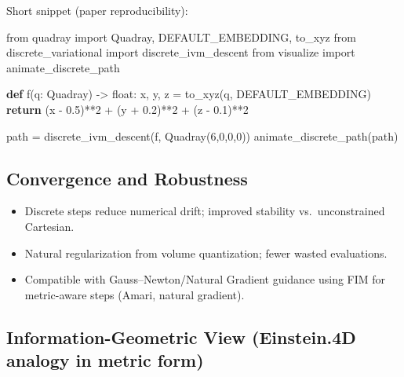 \documentclass[
]{article}
\newenvironment{Shaded}{}{}
\newcommand{\BuiltInTok}[1]{#1}
\newcommand{\ControlFlowTok}[1]{\textcolor[rgb]{0.00,0.44,0.13}{\textbf{#1}}}
\newcommand{\DecValTok}[1]{\textcolor[rgb]{0.25,0.63,0.44}{#1}}
\newcommand{\FloatTok}[1]{\textcolor[rgb]{0.25,0.63,0.44}{#1}}
\newcommand{\ImportTok}[1]{#1}
\newcommand{\KeywordTok}[1]{\textcolor[rgb]{0.00,0.44,0.13}{\textbf{#1}}}
\newcommand{\NormalTok}[1]{#1}
\newcommand{\OperatorTok}[1]{\textcolor[rgb]{0.40,0.40,0.40}{#1}}
\providecommand{\tightlist}{%
  \setlength{\itemsep}{0pt}\setlength{\parskip}{0pt}}
\begin{document}
Short snippet (paper reproducibility):

\begin{Shaded}
\begin{Highlighting}[]
\ImportTok{from}\NormalTok{ quadray }\ImportTok{import}\NormalTok{ Quadray, DEFAULT\_EMBEDDING, to\_xyz}
\ImportTok{from}\NormalTok{ discrete\_variational }\ImportTok{import}\NormalTok{ discrete\_ivm\_descent}
\ImportTok{from}\NormalTok{ visualize }\ImportTok{import}\NormalTok{ animate\_discrete\_path}

\KeywordTok{def}\NormalTok{ f(q: Quadray) }\OperatorTok{{-}\textgreater{}} \BuiltInTok{float}\NormalTok{:}
\NormalTok{    x, y, z }\OperatorTok{=}\NormalTok{ to\_xyz(q, DEFAULT\_EMBEDDING)}
    \ControlFlowTok{return}\NormalTok{ (x }\OperatorTok{{-}} \FloatTok{0.5}\NormalTok{)}\OperatorTok{**}\DecValTok{2} \OperatorTok{+}\NormalTok{ (y }\OperatorTok{+} \FloatTok{0.2}\NormalTok{)}\OperatorTok{**}\DecValTok{2} \OperatorTok{+}\NormalTok{ (z }\OperatorTok{{-}} \FloatTok{0.1}\NormalTok{)}\OperatorTok{**}\DecValTok{2}

\NormalTok{path }\OperatorTok{=}\NormalTok{ discrete\_ivm\_descent(f, Quadray(}\DecValTok{6}\NormalTok{,}\DecValTok{0}\NormalTok{,}\DecValTok{0}\NormalTok{,}\DecValTok{0}\NormalTok{))}
\NormalTok{animate\_discrete\_path(path)}
\end{Highlighting}
\end{Shaded}

\hypertarget{convergence-and-robustness}{%
\subsection{Convergence and
Robustness}\label{convergence-and-robustness}}

\begin{itemize}
\tightlist
\item
  Discrete steps reduce numerical drift; improved stability
  vs.~unconstrained Cartesian.
\item
  Natural regularization from volume quantization; fewer wasted
  evaluations.
\item
  Compatible with Gauss--Newton/Natural Gradient guidance using FIM for
  metric-aware steps (Amari, natural gradient).
\end{itemize}

\hypertarget{information-geometric-view-einstein.4d-analogy-in-metric-form}{%
\subsection{Information-Geometric View (Einstein.4D analogy in metric
form)}\label{information-geometric-view-einstein.4d-analogy-in-metric-form}}
\end{document}
